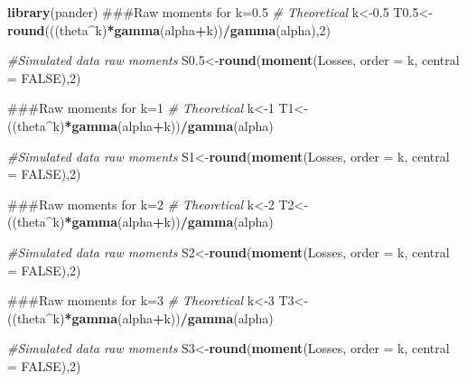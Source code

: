 \documentclass[]{book}
\newenvironment{Shaded}{\begin{snugshade}}{\end{snugshade}}
\newcommand{\KeywordTok}[1]{\textcolor[rgb]{0.13,0.29,0.53}{\textbf{#1}}}
\newcommand{\DataTypeTok}[1]{\textcolor[rgb]{0.13,0.29,0.53}{#1}}
\newcommand{\DecValTok}[1]{\textcolor[rgb]{0.00,0.00,0.81}{#1}}
\newcommand{\FloatTok}[1]{\textcolor[rgb]{0.00,0.00,0.81}{#1}}
\newcommand{\CommentTok}[1]{\textcolor[rgb]{0.56,0.35,0.01}{\textit{#1}}}
\newcommand{\OtherTok}[1]{\textcolor[rgb]{0.56,0.35,0.01}{#1}}
\newcommand{\OperatorTok}[1]{\textcolor[rgb]{0.81,0.36,0.00}{\textbf{#1}}}
\newcommand{\NormalTok}[1]{#1}
\theoremstyle{definition}
\theoremstyle{definition}
\theoremstyle{definition}
\theoremstyle{remark}
\begin{document}
\begin{Shaded}
\begin{Highlighting}[]
\KeywordTok{library}\NormalTok{(pander)}
\NormalTok{###Raw moments for k=0.5}
\CommentTok{# Theoretical }
\NormalTok{k<-}\FloatTok{0.5}
\NormalTok{T0.}\DecValTok{5}\NormalTok{<-}\KeywordTok{round}\NormalTok{(((theta}\OperatorTok{^}\NormalTok{k)}\OperatorTok{*}\KeywordTok{gamma}\NormalTok{(alpha}\OperatorTok{+}\NormalTok{k))}\OperatorTok{/}\KeywordTok{gamma}\NormalTok{(alpha),}\DecValTok{2}\NormalTok{)}

\CommentTok{#Simulated data raw moments}
\NormalTok{S0.}\DecValTok{5}\NormalTok{<-}\KeywordTok{round}\NormalTok{(}\KeywordTok{moment}\NormalTok{(Losses, }\DataTypeTok{order =}\NormalTok{ k, }\DataTypeTok{central =} \OtherTok{FALSE}\NormalTok{),}\DecValTok{2}\NormalTok{)}


\NormalTok{###Raw moments for k=1}
\CommentTok{# Theoretical }
\NormalTok{k<-}\DecValTok{1}
\NormalTok{T1<-((theta}\OperatorTok{^}\NormalTok{k)}\OperatorTok{*}\KeywordTok{gamma}\NormalTok{(alpha}\OperatorTok{+}\NormalTok{k))}\OperatorTok{/}\KeywordTok{gamma}\NormalTok{(alpha)}

\CommentTok{#Simulated data raw moments}
\NormalTok{S1<-}\KeywordTok{round}\NormalTok{(}\KeywordTok{moment}\NormalTok{(Losses, }\DataTypeTok{order =}\NormalTok{ k, }\DataTypeTok{central =} \OtherTok{FALSE}\NormalTok{),}\DecValTok{2}\NormalTok{)}

\NormalTok{###Raw moments for k=2}
\CommentTok{# Theoretical }
\NormalTok{k<-}\DecValTok{2}
\NormalTok{T2<-((theta}\OperatorTok{^}\NormalTok{k)}\OperatorTok{*}\KeywordTok{gamma}\NormalTok{(alpha}\OperatorTok{+}\NormalTok{k))}\OperatorTok{/}\KeywordTok{gamma}\NormalTok{(alpha)}

\CommentTok{#Simulated data raw moments}
\NormalTok{S2<-}\KeywordTok{round}\NormalTok{(}\KeywordTok{moment}\NormalTok{(Losses, }\DataTypeTok{order =}\NormalTok{ k, }\DataTypeTok{central =} \OtherTok{FALSE}\NormalTok{),}\DecValTok{2}\NormalTok{)}

\NormalTok{###Raw moments for k=3}
\CommentTok{# Theoretical }
\NormalTok{k<-}\DecValTok{3}
\NormalTok{T3<-((theta}\OperatorTok{^}\NormalTok{k)}\OperatorTok{*}\KeywordTok{gamma}\NormalTok{(alpha}\OperatorTok{+}\NormalTok{k))}\OperatorTok{/}\KeywordTok{gamma}\NormalTok{(alpha)}

\CommentTok{#Simulated data raw moments}
\NormalTok{S3<-}\KeywordTok{round}\NormalTok{(}\KeywordTok{moment}\NormalTok{(Losses, }\DataTypeTok{order =}\NormalTok{ k, }\DataTypeTok{central =} \OtherTok{FALSE}\NormalTok{),}\DecValTok{2}\NormalTok{)}


\end{Highlighting}
\end{Shaded}
\end{document}
